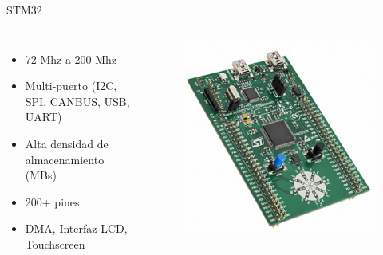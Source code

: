 \documentclass[10pt]{beamer}
\begin{document}
\begin{frame}{STM32}
	\begin{columns}
			\begin{itemize}
				\item 72 Mhz a 200 Mhz
                \item Multi-puerto (I2C, SPI, CANBUS, USB, UART)
                \item Alta densidad de almacenamiento (MBs)
                \item 200+ pines
                \item DMA, Interfaz LCD, Touchscreen
			\end{itemize}
			\begin{center}
				\begin{figure}
					\includegraphics[width=1\textwidth]{img/f3discovery.jpg}
				\end{figure}
			\end{center}
	\end{columns}
\end{frame}
\end{document}
